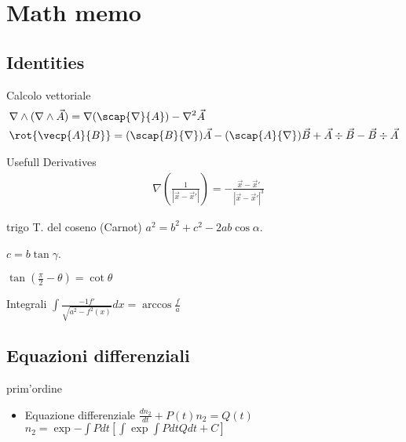 \section{Math memo}

\subsection{Identities}

\begin{frame}{Calcolo vettoriale}
    \begin{align*}
    &\nabla\wedge(\nabla\wedge\vec{A})=\nabla(\scap{\nabla}{A})-\nabla^2\vec{A}\\
    &\rot{\vecp{A}{B}}=(\scap{B}{\nabla})\vec{A}-(\scap{A}{\nabla})\vec{B}+\vec{A}\div{\vec{B}}-\vec{B}\div{\vec{A}}
    \end{align*}
\end{frame}

\begin{frame}{Usefull Derivatives}
    \begin{align*}
        &\nabla(\frac{1}{|\vec{x}-\vec{x}'|})=-\frac{\vec{x}-\vec{x}'}{|\vec{x}-\vec{x}'|^3}
    \end{align*}
\end{frame}

\begin{frame}{trigo}
T. del coseno (Carnot) $a^2=b^2+c^2-2ab\cos{\alpha}$.

$c=b\tan{\gamma}$.

$\tan{(\frac{\pi}{2}-\theta)}=\cot{\theta}$

\end{frame}

\begin{frame}{Integrali}
$\int\frac{-1f'}{\sqrt{a^2-f^2(x)}}dx=\arccos{\frac{f}{a}}$

\end{frame}

\subsection{Equazioni differenziali}

\begin{frame}{prim'ordine}
    \begin{itemize}
        \item Equazione differenziale $\frac{dn_2}{dt}+P(t)n_2=Q(t)$\\
$n_2=\exp{-\int Pdt}[\int\exp{\int Pdt}Qdt+C]$
    \end{itemize}
\end{frame}

